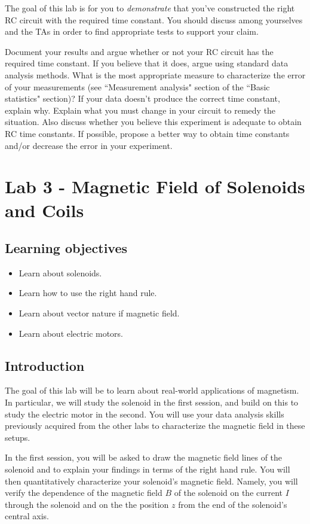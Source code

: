 \documentclass[12pt]{report}
\begin{document}
{\color{blue}The goal of this lab is for you to \textit{demonstrate} that you've constructed the right RC circuit with the required time constant. 
You should discuss among yourselves and the TAs in order to find appropriate tests to support your claim.}

{\color{blue}Document your results and argue whether or not your RC circuit has the required time constant. If you believe that it does, argue using standard data analysis methods. What is the most appropriate measure to characterize the error of your measurements (see ``Measurement analysis" section of the ``Basic statistics" section)? If your data doesn't produce the correct time constant, explain why. Explain what you must change in your circuit to remedy the situation. Also discuss whether you believe this experiment is adequate to obtain RC time constants. If possible, propose a better way to obtain time constants and/or decrease the error in your experiment.}


\chapter{Lab 3 - Magnetic Field of Solenoids and Coils}
\section{Learning objectives}
\begin{itemize}
\item Learn about solenoids.
\item Learn how to use the right hand rule.
\item Learn about vector nature if magnetic field.
\item Learn about electric motors.
\end{itemize}

\section{Introduction}
The goal of this lab will be to learn about real-world applications of magnetism. In particular, we will study the solenoid in the first session, and build on this to study the electric motor in the second. You will use your data analysis skills previously acquired from the other labs to characterize the magnetic field in these setups.

In the first session, you will be asked to draw the magnetic field lines of the solenoid and to explain your findings in terms of the right hand rule. You will then quantitatively characterize your solenoid's magnetic field. Namely, you will verify the dependence of the magnetic field $B$ of the solenoid on the current $I$ through the solenoid and on the the position $z$ from the end of the solenoid's central axis.
\end{document}
